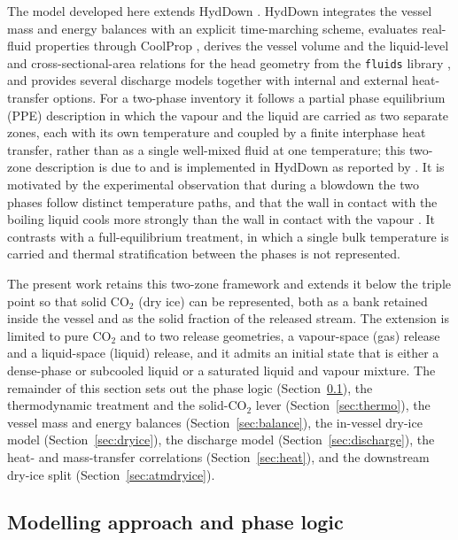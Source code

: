 \documentclass[5p,authoryear]{elsarticle}
\begin{document}
The model developed here extends HydDown \citep{Andreasen2021, Andreasen2026}. HydDown
integrates the vessel mass and energy balances with an explicit time-marching scheme, evaluates
real-fluid properties through CoolProp \citep{Bell2014}, derives the vessel volume and the
liquid-level and cross-sectional-area relations for the head geometry from the \texttt{fluids}
library \citep{CalebBell_fluids}, and provides several discharge models together with internal and
external heat-transfer options. For a two-phase inventory it follows a
partial phase equilibrium (PPE) description in which the vapour and the liquid are carried as two
separate zones, each with its own temperature and coupled by a finite interphase heat transfer,
rather than as a single well-mixed fluid at one temperature; this two-zone description is due to
\citet{SperanzaTerenzi2005} and is implemented in HydDown as reported
by \citet{AndreasenStegelmann2026}. It is motivated by the experimental observation that during a
blowdown the two phases follow distinct temperature paths, and that the wall in contact with the
boiling liquid cools more strongly than the wall in contact with the vapour
\citep{SperanzaTerenzi2005}. It contrasts with a full-equilibrium treatment, in which a single
bulk temperature is carried and thermal stratification between the phases is not represented.

The present work retains this two-zone framework and extends it below the triple point so that
solid CO$_2$ (dry ice) can be represented, both as a bank retained inside the vessel and as the
solid fraction of the released stream. The extension is limited to pure CO$_2$ and to two release
geometries, a vapour-space (gas) release and a liquid-space (liquid) release, and it admits an
initial state that is either a dense-phase or subcooled liquid or a saturated liquid and vapour
mixture. The remainder of this section sets out the phase logic
(Section~\ref{sec:model-logic}), the thermodynamic treatment and the solid-CO$_2$ lever
(Section~\ref{sec:thermo}), the vessel mass and energy balances (Section~\ref{sec:balance}), the
in-vessel dry-ice model (Section~\ref{sec:dryice}), the discharge model
(Section~\ref{sec:discharge}), the heat- and mass-transfer correlations (Section~\ref{sec:heat}),
and the downstream dry-ice split (Section~\ref{sec:atmdryice}).

\subsection{Modelling approach and phase logic}
\label{sec:model-logic}
\end{document}
